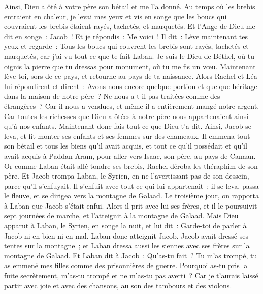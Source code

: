 \begin{multicols}{2}
Ainsi, Dieu a ôté à votre père son bétail et me l'a donné.
Au temps où les brebis entraient en chaleur, je levai mes yeux et vis en songe que les boucs qui couvraient les brebis étaient rayés, tachetés, et marquetés.
Et l'Ange de Dieu me dit en songe~: Jacob~! Et je répondis~: Me voici~!
Il dit~: Lève maintenant tes yeux et regarde~: Tous les boucs qui couvrent les brebis sont rayés, tachetés et marquetés, car j'ai vu tout ce que te fait Laban.
Je suis le Dieu de Béthel, où tu oignis la pierre que tu dressas pour monument, où tu me fis un vœu. Maintenant lève-toi, sors de ce pays, et retourne au pays de ta naissance.
Alors Rachel et Léa lui répondirent et dirent~: Avons-nous encore quelque portion et quelque héritage dans la maison de notre père~?
Ne nous a-t-il pas traitées comme des étrangères~? Car il nous a vendues, et même il a entièrement mangé notre argent.
Car toutes les richesses que Dieu a ôtées à notre père nous appartenaient ainsi qu'à nos enfants. Maintenant donc fais tout ce que Dieu t'a dit.
Ainsi, Jacob se leva, et fit monter ses enfants et ses femmes sur des chameaux.
Il emmena tout son bétail et tous les biens qu'il avait acquis, et tout ce qu'il possédait et qu'il avait acquis à Paddan-Aram, pour aller vers Isaac, son père, au pays de Canaan.
Or comme Laban était allé tondre ses brebis, Rachel déroba les théraphim de son père.
Et Jacob trompa Laban, le Syrien, en ne l'avertissant pas de son dessein, parce qu'il s'enfuyait.
Il s'enfuit avec tout ce qui lui appartenait~; il se leva, passa le fleuve, et se dirigea vers la montagne de Galaad.
Le troisième jour, on rapporta à Laban que Jacob s'était enfui.
Alors il prit avec lui ses frères, et il le poursuivit sept journées de marche, et l'atteignit à la montagne de Galaad.
Mais Dieu apparut à Laban, le Syrien, en songe la nuit, et lui dit~: Garde-toi de parler à Jacob ni en bien ni en mal.
Laban donc atteignit Jacob. Jacob avait dressé ses tentes sur la montagne~; et Laban dressa aussi les siennes avec ses frères sur la montagne de Galaad.
Et Laban dit à Jacob~: Qu'as-tu fait~? Tu m'as trompé, tu as emmené mes filles comme des prisonnières de guerre.
Pourquoi as-tu pris la fuite secrètement, m'as-tu trompé et ne m'as-tu pas averti~? Car je t'aurais laissé partir avec joie et avec des chansons, au son des tambours et des violons.

\end{multicols}
